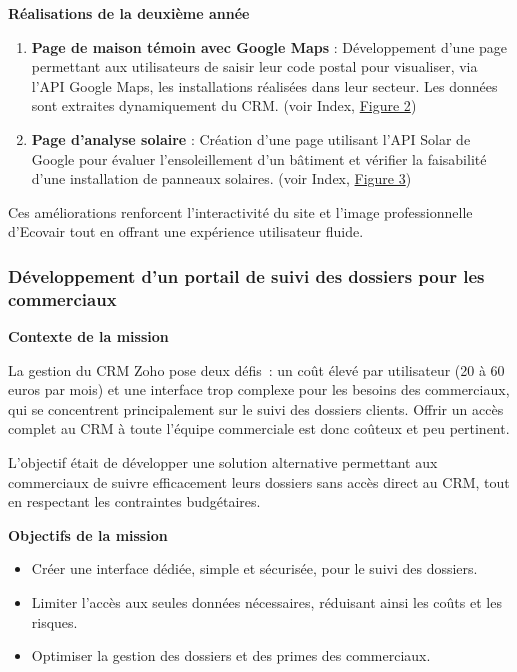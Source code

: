 \textbf{Réalisations de la deuxième année}\vspace{0.3cm}

\begin{enumerate}
    \item \textbf{Page de maison témoin avec Google Maps} : Développement d’une page permettant aux utilisateurs de saisir leur code postal pour visualiser, via l’API Google Maps, les installations réalisées dans leur secteur. Les données sont extraites dynamiquement du CRM. (voir Index,  \hyperref[fig:maison-temoin]{Figure 2})\vspace{0.3cm}
    \item \textbf{Page d’analyse solaire} : Création d’une page utilisant l’API Solar de Google pour évaluer l’ensoleillement d’un bâtiment et vérifier la faisabilité d’une installation de panneaux solaires. (voir Index, \hyperref[fig:analyse-solaire]{Figure 3})\vspace{0.3cm}
\end{enumerate}

Ces améliorations renforcent l’interactivité du site et l’image professionnelle d’Ecovair tout en offrant une expérience utilisateur fluide.

\subsubsection{Développement d’un portail de suivi des dossiers pour les commerciaux}

\textbf{Contexte de la mission}\vspace{0.3cm}

La gestion du CRM Zoho pose deux défis~: un coût élevé par utilisateur (20 à 60 euros par mois) et une interface trop complexe pour les besoins des commerciaux, qui se concentrent principalement sur le suivi des dossiers clients. Offrir un accès complet au CRM à toute l’équipe commerciale est donc coûteux et peu pertinent.

L’objectif était de développer une solution alternative permettant aux commerciaux de suivre efficacement leurs dossiers sans accès direct au CRM, tout en respectant les contraintes budgétaires.\vspace{0.3cm}

\textbf{Objectifs de la mission}\vspace{0.3cm}

\begin{itemize}
    \item Créer une interface dédiée, simple et sécurisée, pour le suivi des dossiers.\vspace{0.3cm}
    \item Limiter l’accès aux seules données nécessaires, réduisant ainsi les coûts et les risques.\vspace{0.3cm}
    \item Optimiser la gestion des dossiers et des primes des commerciaux.\vspace{0.3cm}
\end{itemize}

